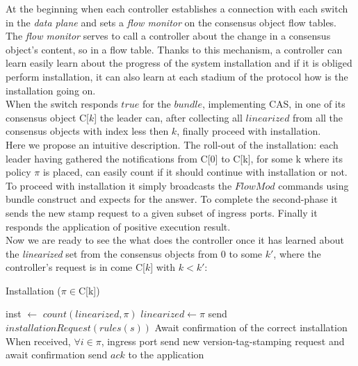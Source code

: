 \documentclass{article}
\theoremstyle{remark}
\begin{document}
%
At the beginning when each controller establishes a connection with each switch in the \emph{data plane} and sets a \emph{flow monitor} on the consensus object flow tables. The \emph{flow monitor} serves to call a controller about the change in a consensus object's content, so in a flow table. Thanks to this mechanism, a controller can learn easily learn about the progress of the system installation and if it is obliged perform installation, it can also learn at each stadium of the protocol how is the installation going on. \\
When  the switch responds $true$ for the $bundle$, implementing CAS, in one of its  consensus object C[$k$] the leader can, after collecting all $linearized$ from all the consensus objects with index less then $k$, finally proceed with installation.\\
Here we propose an intuitive description. The roll-out of the installation: each leader having gathered the notifications from C[0] to C[k], for some k where its policy $\pi$ is placed, can easily count if it should continue with installation or not. To proceed with installation it simply broadcasts the $FlowMod$ commands using bundle construct and expects for the answer. To complete the second-phase it sends the new stamp request to a given subset of ingress ports. Finally it responds the application of positive execution result.\\
Now we are ready to see the what does the controller once it has learned about the \emph{linearized} set from the consensus objects from 0 to some $k'$, where the controller's request is in come C[$k$] with $k<k'$:
\begin{algorithm}
 \caption{Installation ($\pi\in$C[k])}
 \begin{algorithmic}[1]\label{Installation}
 \State inst $\gets$ $count(linearized, \pi)$
 	\State $linearized\gets \pi$
 	  send $installationRequest(rules(s))$
 	\EndFor
 	\State Await confirmation of the correct installation
 	\State When received, $\forall i\in\pi$, ingress port send new version-tag-stamping request and await confirmation
 	\State send $ack$ to the application
 \EndIf
 \end{algorithmic}
\end{algorithm}
\end{document}
